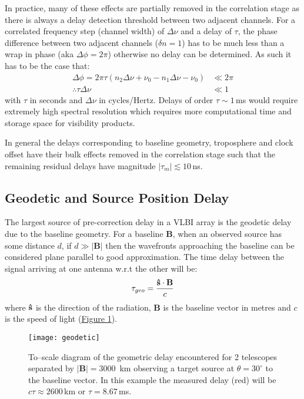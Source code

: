 		In practice, many of these effects are partially removed in the correlation stage as there is always a delay detection threshold between two adjacent channels. For a correlated frequency step (channel width) of $\Delta\nu$ and a delay of $\tau$, the phase difference between two adjacent channels ($\delta n = 1$) has to be much less than a wrap in phase (aka $\Delta\phi = 2\pi$) otherwise no delay can be determined. As such it has to be the case that:
		\begin{align*}
			\Delta\phi=2\pi\tau(n_2\Delta\nu+\nu_0-n_1\Delta\nu-\nu_0)&\ll2\pi\\
			\therefore \tau\Delta\nu &\ll 1
		\end{align*} with $\tau$ in seconds and $\Delta\nu$ in cycles/Hertz. Delays of order $\tau\sim1$\,ms would require extremely high spectral resolution which requires more computational time and storage space for visibility products.
		
		In general the delays corresponding to baseline geometry, troposphere and clock offset have their bulk effects removed in the correlation stage such that the remaining residual delays have magnitude $|\tau_m|\lesssim 10$\,ns.
	
	\subsection{Geodetic and Source Position Delay}
		The largest source of pre-correction delay in a VLBI array is the geodetic delay due to the baseline geometry. For a baseline $\textbf{B}$, when an observed source has some distance $d$, if $d\gg |\textbf{B}|$ then the wavefronts approaching the baseline can be considered plane parallel to good approximation. The time delay between the signal arriving at one antenna w.r.t the other will be: 
		\begin{equation}
			\tau_{geo}=\frac{{\bf \hat{s}} \cdot {\bf B}}{c}
		\end{equation} where $\bf \hat{s}$ is the direction of the radiation, $\textbf{B}$ is the baseline vector in metres and $c$ is the speed of light (\hyperref[fig:geodeticeffect]{Figure \ref*{fig:geodeticeffect}}).
		
		\begin{figure}[h]
			\centering
			\texttt{[image: geodetic]}
			\caption[Geodetic Effect]{To--scale diagram of the geometric delay encountered for 2 telescopes separated by $|\textbf{B}|=3000$~km observing a target source at $\theta=30^\circ$ to the baseline vector. In this example the measured delay (red) will be $c\tau\approx2600$\,km or $\tau=8.67$\,ms.}\label{fig:geodeticeffect}
		\end{figure}	
		
